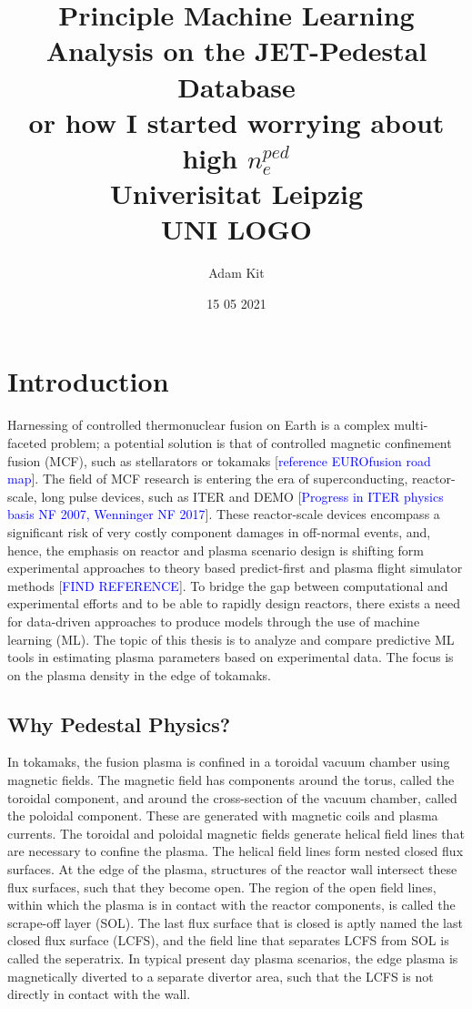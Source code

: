 \documentclass[a4paper, twoside, final, 12pt]{article}
\title{
	{Principle Machine Learning Analysis on the JET-Pedestal Database } \\ 
	{\large or how I started worrying about high $n_e^{ped}$}\\
	{\large Univerisitat Leipzig} \\
	{ UNI LOGO } \\ 
	}
\author{Adam Kit}
\date{15 05 2021}
\begin{document}
    \maketitle
    \newpage
    \tableofcontents
    \newpage
\section{Introduction}\label{sec:introduction}
Harnessing of controlled thermonuclear fusion on Earth is a complex multi-faceted problem; a potential solution is that of controlled magnetic confinement fusion (MCF), such as stellarators or tokamaks [\textcolor{blue}{reference EUROfusion road map}].
The field of MCF research is entering the era of superconducting, reactor-scale, long pulse devices, such as ITER and DEMO [\textcolor{blue}{Progress in ITER physics basis NF 2007, Wenninger NF 2017}].
These reactor-scale devices encompass a significant risk of very costly component damages in off-normal events, and, hence, the emphasis on reactor and plasma scenario design is shifting form experimental approaches to theory based predict-first and plasma flight simulator methods [\textcolor{blue}{FIND REFERENCE}].
To bridge the gap between computational and experimental efforts and to be able to rapidly design reactors, there exists a need for data-driven approaches to produce models through the use of machine learning (ML).
The topic of this thesis is to analyze and compare predictive ML tools in estimating plasma parameters based on experimental data. The focus is on the plasma density in the edge of tokamaks. 

\subsection{Why Pedestal Physics?}\label{subsec:purpose}
In tokamaks, the fusion plasma is confined in a toroidal vacuum chamber using magnetic fields.
The magnetic field has components around the torus, called the toroidal component, and around the cross-section of the vacuum chamber, called the poloidal component.
These are generated with magnetic coils and plasma currents.
The toroidal and poloidal magnetic fields generate helical field lines that are necessary to confine the plasma.
The helical field lines form nested closed flux surfaces.
At the edge of the plasma, structures of the reactor wall intersect these flux surfaces, such that they become open.
The region of the open field lines, within which the plasma is in contact with the reactor components, is called the scrape-off layer (SOL).
The last flux surface that is closed is aptly named the last closed flux surface (LCFS), and the field line that separates LCFS from SOL is called the seperatrix.
In typical present day plasma scenarios, the edge plasma is magnetically diverted to a separate divertor area, such that the LCFS is not directly in contact with the wall.
\end{document}
